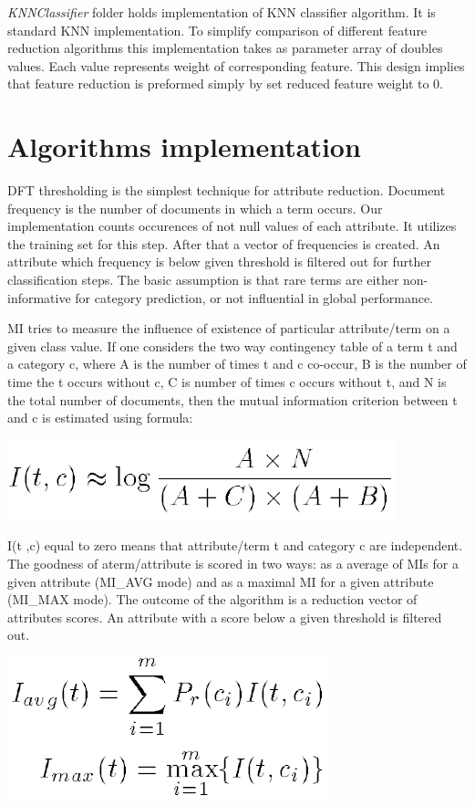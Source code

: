\documentclass[12pt,a4paper]{report}
\begin{document}
\textit{KNNClassifier} folder holds implementation of KNN classifier algorithm. It is standard KNN implementation. To simplify comparison of different feature reduction algorithms this implementation takes as parameter array of doubles values. Each value represents weight of corresponding feature. This design implies that feature reduction is preformed simply by set reduced feature weight to 0.

\chapter{Algorithms implementation}
DFT thresholding is the simplest technique for attribute
reduction. Document frequency is the number of documents in
which a term occurs. Our implementation counts occurences of not null values of each attribute. It utilizes the training set for this step. After that a vector of frequencies is created. An attribute which frequency is below given threshold is filtered out for further classification steps. The basic assumption is that rare
terms are either non-informative for category prediction,
or not influential in global performance.



MI tries to measure the influence of existence of particular attribute/term on a given class value. If one considers the two way contingency table of a term t and a category c, where A is the number of times t and c co-occur, B is the number of time the t occurs without c, C is number of times c occurs without t, and N is the total number of documents, then the mutual information criterion between t and c is estimated using formula:

\includegraphics[scale=0.8]{MI1}

I(t ,c) equal to zero means that attribute/term t and category c are independent. The goodness of aterm/attribute is scored in two ways: as a average of MIs for a given attribute (MI\_AVG mode) and as a maximal MI for a given attribute (MI\_MAX mode). The outcome of the algorithm is a reduction vector of attributes scores. An attribute with a score below a given threshold is filtered out.

\includegraphics[scale=0.8]{MI_scores}
\end{document}

